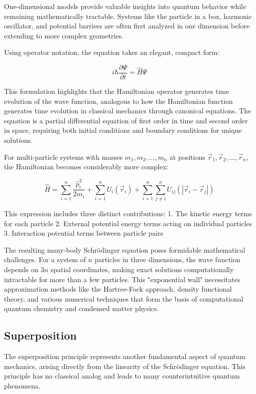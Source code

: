 \documentclass[italian]{HKNdocument}
\begin{document}
One-dimensional models provide valuable insights into quantum behavior while remaining mathematically tractable. Systems like the particle in a box, harmonic oscillator, and potential barriers are often first analyzed in one dimension before extending to more complex geometries.

Using operator notation, the equation takes an elegant, compact form:

\begin{equation}
i \hbar \frac{\partial \Psi}{\partial t}=\hat{H} \Psi \label{eq:1.17}
\end{equation}

This formulation highlights that the Hamiltonian operator generates time evolution of the wave function, analogous to how the Hamiltonian function generates time evolution in classical mechanics through canonical equations. The equation is a partial differential equation of first order in time and second order in space, requiring both initial conditions and boundary conditions for unique solutions.

For multi-particle systems with masses $m_{1}, m_{2}, \ldots, m_{n}$ at positions $\vec{r}_{1}, \vec{r}_{2}, \ldots, \vec{r}_{n}$, the Hamiltonian becomes considerably more complex:

\begin{equation}
\hat{H}=\sum_{i=1}^{n} \frac{\hat{p}_i^{2}}{2 m_{i}}+\sum_{i=1}^{n} U_{i}\left(\vec{r}_{i}\right)+\sum_{i=1}^{n} \sum_{j \neq i}^{n} U_{i j}\left(\left|\vec{r}_{i}-\vec{r}_{j}\right|\right) \label{eq:1.18}
\end{equation}

This expression includes three distinct contributions:
1. The kinetic energy terms for each particle
2. External potential energy terms acting on individual particles
3. Interaction potential terms between particle pairs

The resulting many-body Schrödinger equation poses formidable mathematical challenges. For a system of $n$ particles in three dimensions, the wave function depends on $3n$ spatial coordinates, making exact solutions computationally intractable for more than a few particles. This "exponential wall" necessitates approximation methods like the Hartree-Fock approach, density functional theory, and various numerical techniques that form the basis of computational quantum chemistry and condensed matter physics.

\subsection{Superposition}
The superposition principle represents another fundamental aspect of quantum mechanics, arising directly from the linearity of the Schrödinger equation. This principle has no classical analog and leads to many counterintuitive quantum phenomena.
\end{document}
